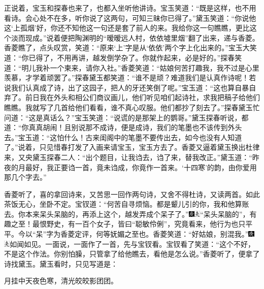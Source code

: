 正说着，宝玉和探春也来了，也都入坐听他讲诗。宝玉笑道：“既是这样，也不用看诗。会心处不在多，听你说了这两句，可知三昧你已得了。”黛玉笑道：“你说他这‘上孤烟’好，你还不知他这一句还是套了前人的来。我给你这一句瞧瞧，更比这个淡而现成。”说着便把陶渊明的“暧暧远人村，依依墟里烟”翻了出来，递与香菱。香菱瞧了，点头叹赏，笑道：“原来‘上’字是从‘依依’两个字上化出来的。”宝玉大笑道：“你已得了，不用再讲，越发倒学杂了。你就作起来，必是好的。”探春笑道：“明儿我补一个柬来，请你入社。”香菱笑道：“姑娘何苦打趣我，我不过是心里羡慕，才学着顽罢了。”探春黛玉都笑道：“谁不是顽？难道我们是认真作诗呢！若说我们认真成了诗，出了这园子，把人的牙还笑倒了呢。”宝玉道：“这也算自暴自弃了。前日我在外头和相公们商议画儿，他们听见咱们起诗社，求我把稿子给他们瞧瞧。我就写了几首给他们看看，谁不真心叹服。他们都抄了刻去了。”探春黛玉忙问道：“这是真话么？”宝玉笑道：“说谎的是那架上的鹦哥。”黛玉探春听说，都道：“你真真胡闹！且别说那不成诗，便是成诗，我们的笔墨也不该传到外头去。”宝玉道：“这怕什么！古来闺阁中的笔墨不要传出去，如今也没有人知道了。”说着，只见惜春打发了入画来请宝玉，宝玉方去了。香菱又逼着黛玉换出杜律来，又央黛玉探春二人：“出个题目，让我诌去，诌了来，替我改正。”黛玉道：“昨夜的月最好，我正要诌一首，竟未诌成，你竟作一首来。‘十四寒’的韵，由你爱用那几个字去。”

香菱听了，喜的拿回诗来，又苦思一回作两句诗，又舍不得杜诗，又读两首。如此茶饭无心，坐卧不定。宝钗道：“何苦自寻烦恼。都是颦儿引的你，我和他算账去。你本来呆头呆脑的，再添上这个，越发弄成个呆子了。”{\includegraphics[width=3mm]{../Images/00004}\includegraphics[width=3mm]{../Images/00012}\footnotesize \kaishu “呆头呆脑的”，有趣之至！最恨野史，有一百个女子，皆曰“聪敏伶俐”，究竟看来，他行为也只平平。今以“呆”字为香菱定评，何等妩媚之至也。}香菱笑道：“好姑娘，别混我。”{\includegraphics[width=3mm]{../Images/00004}\includegraphics[width=3mm]{../Images/00012}\footnotesize \kaishu 如闻如见。}一面说，一面作了一首，先与宝钗看。宝钗看了笑道：“这个不好，不是这个作法。你别怕臊，只管拿了给他瞧去，看他是怎么说。”香菱听了，便拿了诗找黛玉。黛玉看时，只见写道是：

月挂中天夜色寒，清光皎皎影团团。

